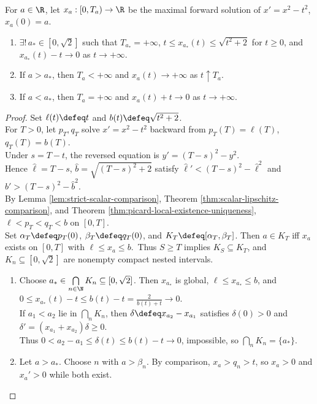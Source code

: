 \begin{theorem} \label{thm:riccati-separatrix-classification} \\
For $a\in\R$, let $x_a:[0,T_a)\to\R$ be the maximal forward solution of $x'=x^2-t^2$, $x_a(0)=a$.
\begin{enumerate}[label=(\roman*)]
\setlength{\itemsep}{0pt}
\item $\exists!\,a_*\in[0,\sqrt2]$ such that $T_{a_*}=+\infty$, $t\leq x_{a_*}(t)\leq\sqrt{t^2+2}$ for $t\geq0$, and $x_{a_*}(t)-t\to0$ as $t\to+\infty$.
\item If $a>a_*$, then $T_a<+\infty$ and $x_a(t)\to+\infty$ as $t\uparrow T_a$.
\item If $a<a_*$, then $T_a=+\infty$ and $x_a(t)+t\to0$ as $t\to+\infty$.
\end{enumerate}
\begin{proof} Set $\ell(t)\defeq t$ and $b(t)\defeq\sqrt{t^2+2}$.\\
For $T>0$, let $p_T,q_T$ solve $x'=x^2-t^2$ backward from $p_T(T)=\ell(T)$, $q_T(T)=b(T)$.\\
Under $s=T-t$, the reversed equation is $y'=(T-s)^2-y^2$.\\
Hence $\widehat\ell=T-s$, $\widehat b=\sqrt{(T-s)^2+2}$ satisfy $\widehat\ell'<(T-s)^2-\widehat\ell^2$ and $\widehat b'>(T-s)^2-\widehat b^2$.\\
By Lemma \ref{lem:strict-scalar-comparison}, Theorem \ref{thm:scalar-lipschitz-comparison}, and Theorem \ref{thm:picard-local-existence-uniqueness}, $\ell<p_T<q_T<b$ on $[0,T]$.\\
Set $\alpha_T\defeq p_T(0)$, $\beta_T\defeq q_T(0)$, and $K_T\defeq[\alpha_T,\beta_T]$. Then $a\in K_T$ iff $x_a$ exists on $[0,T]$ with $\ell\leq x_a\leq b$.\
Thus $S\geq T$ implies $K_S\subseteq K_T$, and $K_n\subseteq[0,\sqrt2]$ are nonempty compact nested intervals.
\begin{enumerate}[label=(\roman*)]
\setlength{\itemsep}{0pt}
\item Choose $a_*\in\bigcap\limits_{n\in\N}K_n\subseteq[0,\sqrt2]$. Then $x_{a_*}$ is global, $\ell\leq x_{a_*}\leq b$, and $0\leq x_{a_*}(t)-t\leq b(t)-t=\frac{2}{b(t)+t}\to0$.\\
If $a_1<a_2$ lie in $\bigcap\limits_nK_n$, then $\delta\defeq x_{a_2}-x_{a_1}$ satisfies $\delta(0)>0$ and $\delta'=(x_{a_1}+x_{a_2})\delta\geq0$.\\
Thus $0<a_2-a_1\leq\delta(t)\leq b(t)-t\to0$, impossible, so $\bigcap\limits_nK_n=\{a_*\}$.
\item Let $a>a_*$. Choose $n$ with $a>\beta_n$. By comparison, $x_a>q_n>t$, so $x_a>0$ and $x_a'>0$ while both exist.\\

\end{enumerate}
\end{proof}
\end{theorem}
